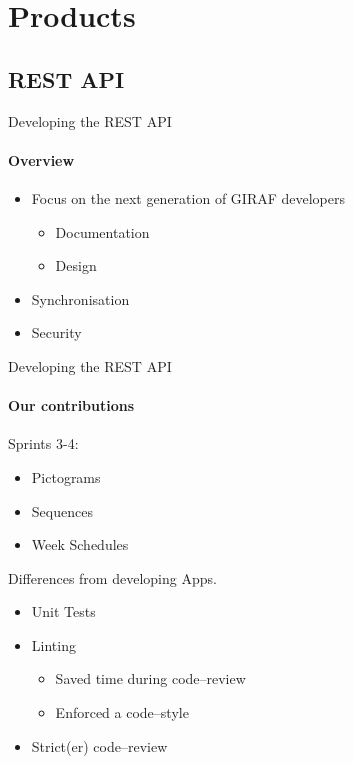 \section{Products}
    \subsection{REST API}
        \begin{frame}[t]{Developing the REST API}\framesubtitle{Overview}
            \begin{itemize}
                \item Focus on the next generation of GIRAF developers
                \begin{itemize}
                    \item Documentation
                    \item Design
                \end{itemize}
                \item Synchronisation
                \item Security
            \end{itemize}
        \end{frame}

        \begin{frame}[t]{Developing the REST API}\framesubtitle{Our contributions}
            Sprints 3-4:
            \begin{itemize}
                \item Pictograms
                \item Sequences
                \item Week Schedules
            \end{itemize}
            \bigskip
            Differences from developing Apps.
            \begin{itemize}
                \item Unit Tests
                \item Linting
                \begin{itemize}
                    \item Saved time during code--review
                    \item Enforced a code--style
                \end{itemize}
                \item Strict(er) code--review
            \end{itemize}
        \end{frame}
